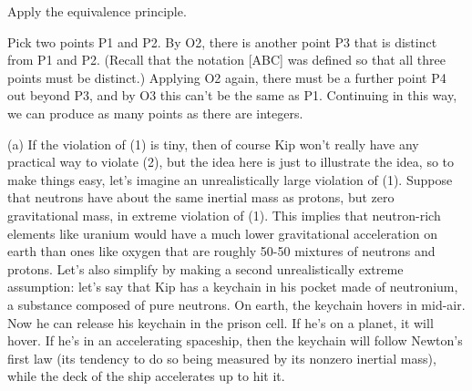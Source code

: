 \label{hwansappendix}%
\appendix\noindent{}
	


\noindent{}

 Apply the equivalence principle.\label{hint:tossed-clock}





Pick two points P1 and P2. By O2, there is another point P3 that is distinct
from P1 and P2. (Recall that the notation [ABC] was defined so that all three
points must be distinct.) Applying O2 again, there must be a further point
P4 out beyond P3, and by O3 this can't be the same as P1. Continuing in this
way, we can produce as many points as there are integers.


(a) If the violation of (1) is tiny, then of course Kip won't really have any
practical way to violate (2), but the idea here is just to illustrate the
idea, so to make things easy, let's imagine an unrealistically large violation
of (1). Suppose that neutrons have about the same inertial mass as protons, but
zero gravitational mass, in extreme violation of (1). This implies that neutron-rich
elements like uranium would have a much lower gravitational acceleration on earth
than ones like oxygen that are roughly 50-50 mixtures of neutrons and protons.
Let's also simplify by making a second unrealistically extreme assumption: let's
say  that Kip has a keychain in his pocket made of neutronium, a substance composed of
pure neutrons. On earth, the keychain hovers in mid-air. Now he can release
his keychain in the prison cell. If he's on a planet, it will hover.
If he's in an accelerating spaceship, then the keychain will follow Newton's
first law (its tendency to do so being measured by its nonzero inertial mass),
while the deck of the ship accelerates up to hit it.

